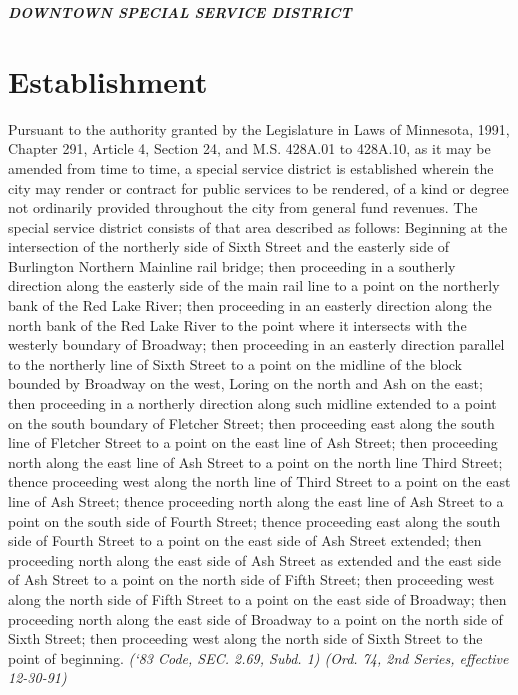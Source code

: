 \centerline{\textbf{\emph{\LARGE{DOWNTOWN SPECIAL SERVICE DISTRICT}}}}
\setcounter{section}{14}
\section{Establishment}
Pursuant to the authority granted by the Legislature in Laws of Minnesota, 1991, Chapter 291, Article 4, Section 24, and M.S. \textsection 428A.01 to \textsection 428A.10, as it may be amended from time to time, a special service district is established wherein the city may render or contract for public services to be rendered, of a kind or degree not ordinarily provided throughout the city from general fund revenues. The special service district consists of that area described as follows:\newline
\newline
Beginning at the intersection of the northerly side of Sixth Street and the easterly side of Burlington Northern Mainline rail bridge; then proceeding in a southerly direction along the easterly side of the main rail line to a point on the northerly bank of the Red Lake River; then proceeding in an easterly direction along the north bank of the Red Lake River to the point where it intersects with the westerly boundary of Broadway; then proceeding in an easterly direction parallel to the northerly line of Sixth Street to a point on the midline of the block bounded by Broadway on the west, Loring on the north and Ash on the east; then proceeding in a northerly direction along such midline extended to a point on the south boundary of Fletcher Street; then proceeding east along the south line of Fletcher Street to a point on the east line of Ash Street; then proceeding north along the east line of Ash Street to a point on the north line Third Street; thence proceeding west along the north line of Third Street to a point on the east line of Ash Street; thence proceeding north along the east line of Ash Street to a point on the south side of Fourth Street; thence proceeding east along the south side of Fourth Street to a point on the east side of Ash Street extended; then proceeding north along the east side of Ash Street as extended and the east side of Ash Street to a point on the north side of Fifth Street; then proceeding west along the north side of Fifth Street to a point on the east side of Broadway; then proceeding north along the east side of Broadway to a point on the north side of Sixth Street; then proceeding west along the north side of Sixth Street to the point of beginning.\newline
\emph{(‘83 Code, SEC. 2.69, Subd. 1) (Ord. 74, 2nd Series, effective 12-30-91)}

